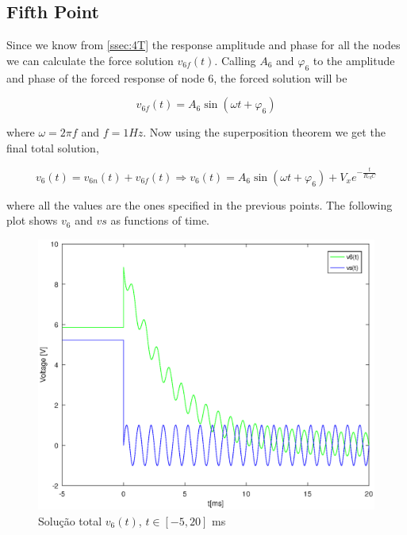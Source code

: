 \begin{table}[h!]
\centering
\begin{tabularx}{1.0\textwidth} {
  | >{\raggedright\arraybackslash}X
  | >{\centering\arraybackslash}X
  | >{\centering\arraybackslash}X
  | >{\raggedleft\arraybackslash}X | }
 \hline

\end{tabularx}
\end{table}

\vspace{5mm}


\subsection{Fifth Point}
\label{ssec:5T}

\par Since we know from \ref{ssec:4T} the response amplitude and phase for all the nodes we can calculate the force solution $v_{6f}(t)$. Calling $A_6$ and $\varphi _6$ to the amplitude and phase of the forced response of node 6, the forced solution will be 

\begin{equation}
  v_{6f}(t) = A_6 \sin(\omega t + \varphi _6)
  \label{eq:fsol}
\end{equation}

where $\omega=2\pi f$ and $f=1Hz$. Now using the superposition theorem we get the final total solution,

\begin{equation}
  v_{6}(t) = v_{6n}(t)+v_{6f}(t) \Rightarrow v_{6}(t) = A_6 \sin(\omega t + \varphi _6) + V_x e^{-\frac{t}{R_{eq}C}}
  \label{eq:gensol}
\end{equation}

where all the values are the ones specified in the previous points. The following plot shows $v_6$ and $vs$ as functions of time.

\begin{figure}[h!] \centering
\includegraphics[width=0.6\linewidth]{general_solution.eps}
\caption{Solução total $v_{6}(t)$, $t\in[-5,20]$ ms}
\label{fig:gensol}
\end{figure}

